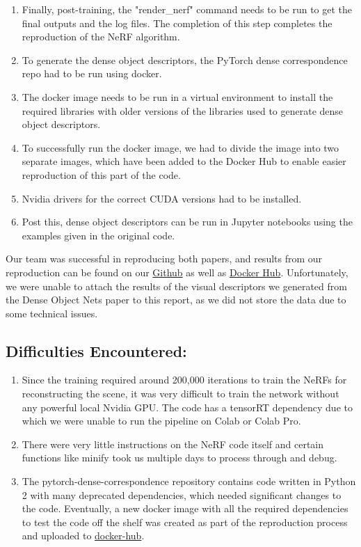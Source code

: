 \documentclass[conference]{IEEEtran}
\begin{document}
\begin{enumerate}
    \item Finally, post-training, the "render\_nerf" command needs to be run to get the final outputs and the log files. The completion of this step completes the reproduction of the NeRF algorithm.
    \item To generate the dense object descriptors, the PyTorch dense correspondence repo had to be run using docker.
    \item The docker image needs to be run in a virtual environment to install the required libraries with older versions of the libraries used to generate dense object descriptors.
    \item To successfully run the docker image, we had to divide the image into two separate images, which have been added to the Docker Hub to enable easier reproduction of this part of the code.
    \item Nvidia drivers for the correct CUDA versions had to be installed.
    \item Post this, dense object descriptors can be run in Jupyter notebooks using the examples given in the original code.
\end{enumerate}

Our team was successful in reproducing both papers, and results from our reproduction can be found on our \href{https://github.com/manuaatitya/rob599-final-project/tree/master/nerf-supervision-public/logs/fork}{Github} as well as \href{https://hub.docker.com/r/manuaatitya/pytorch-dense-correspondence}{Docker Hub}. Unfortunately, we were unable to attach the results of the visual descriptors we generated from the Dense Object Nets paper \cite{florencemanuelli2018dense} to this report, as we did not store the data due to some technical issues.

\subsection{Difficulties Encountered:}
\begin{enumerate}
    \item Since the training required around 200,000 iterations to train the NeRFs for reconstructing the scene, it was very difficult to train the network without any powerful local Nvidia GPU. The code has a tensorRT dependency due to which we were unable to run the pipeline on Colab or Colab Pro.
    \item There were very little instructions on the NeRF code itself and certain functions like minify took us multiple days to process through and debug.
    \item The pytorch-dense-correspondence \cite{florencemanuelli2018dense} repository contains code written in Python 2 with many deprecated dependencies, which needed significant changes to the code. Eventually, a new docker image with all the required dependencies to test the code off the shelf was created as part of the reproduction process and uploaded to \href{https://hub.docker.com/r/manuaatitya/pytorch-dense-correspondence}{docker-hub}.
\end{enumerate}
\end{document}
